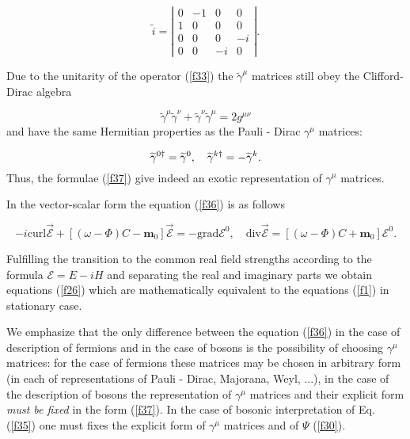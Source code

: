 \documentclass[a4paper,12pt]{article}
\begin{document}
\begin{equation}  \label{f38}
\widetilde{i}=\left|
\begin{array}{cccc}
0 & -1 & 0 & 0 \\
1 & 0 & 0 & 0 \\
0 & 0 & 0 & -i \\
0 & 0 & -i & 0
\end{array}
\right| .
\end{equation}

Due to the unitarity of the operator (\ref{f33}) the $\widetilde{\gamma }%
^\mu $ matrices still obey the Clifford-Dirac algebra

\begin{equation}  \label{f39}
\widetilde{\gamma }^\mu \widetilde{\gamma }^\nu +\widetilde{ \gamma }^\nu
\widetilde{\gamma }^\mu =2g^{\mu \nu }
\end{equation}
and have the same Hermitian properties as the Pauli - Dirac $\gamma ^\mu $
matrices:

\begin{equation}
\widetilde{\gamma }^{0\dagger }=\widetilde{\gamma }^0,\quad \widetilde{%
\gamma }^{k\dagger }=-\widetilde{\gamma }^k.  \label{f40}
\end{equation}
Thus, the formulae (\ref{f37}) give indeed an exotic representation of $%
\gamma ^\mu $ matrices.

In the vector-scalar form the equation (\ref{f36}) is as follows

\begin{equation}
-i\mathrm{curl}\overrightarrow{\mathcal{E}}+\left[ \left( \omega -\Phi
\right) C-\mathbf{m}_0\right] \overrightarrow{\mathcal{E}}=-\mathrm{grad}%
\mathcal{E}^0, \quad \mathrm{div}\overrightarrow{\mathcal{E}}=\left[ \left(
\omega -\Phi \right) C+\mathbf{m}_0\right] \mathcal{E}^0.  \label{f41}
\end{equation}

Fulfilling the transition to the common real field strengths according to
the formula $\mathcal{E}=E-iH$ and separating the real and imaginary parts
we obtain equations (\ref{f26}) which are mathematically equivalent to the
equations (\ref{f1}) in stationary case.

We emphasize that the only difference between the equation (\ref{f36}) in
the case of description of fermions and in the case of bosons is the
possibility of choosing $\gamma ^\mu $ matrices: for the case of fermions
these matrices may be chosen in arbitrary form (in each of representations
of Pauli - Dirac, Majorana, Weyl, ...), in the case of the description of
bosons the representation of $\gamma ^\mu $ matrices and their explicit form
\textit{must be fixed} in the form (\ref{f37}). In the case of bosonic
interpretation of Eq. (\ref{f35}) one must fixes the explicit form of $%
\gamma ^\mu $ matrices and of $\Psi $ (\ref{f30}).
\end{document}
